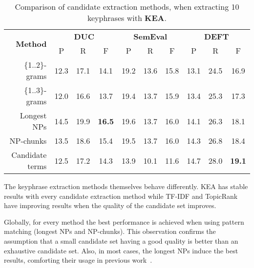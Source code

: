       \begin{table}
        \centering
        \begin{tabular}{rccccccccc}
          \toprule
          \multirow{2}{*}[-2pt]{\textbf{Method}} & \multicolumn{3}{c}{\textbf{DUC}} & \multicolumn{3}{c}{\textbf{SemEval}} & \multicolumn{3}{c}{\textbf{DEFT}}\\
          \cmidrule(r){2-4}\cmidrule(lr){5-7}\cmidrule(l){8-10}
          & P & R & F & P & R & F & P & R & F\\
          \midrule
          \{1..2\}-grams & 12.3 & 17.1 & 14.1 & 19.2 & 13.6 & 15.8 & 13.1 & 24.5 & 16.9\\
          \{1..3\}-grams & 12.0 & 16.6 & 13.7 & 19.4 & 13.7 & 15.9 & 13.4 & 25.3 & 17.3\\
          Longest NPs & 14.5 & 19.9 & \textbf{16.5} & 19.6 & 13.7 & 16.0 & 14.1 & 26.3 & 18.1\\
          NP-chunks & 13.5 & 18.6 & 15.4 & 19.5 & 13.7 & 16.0 & 14.3 & 26.8 & 18.4\\
          Candidate terms & 12.5 & 17.2 & 14.3 & 13.9 & 10.1 & 11.6 & 14.7 & 28.0 & \textbf{19.1}\\
          \bottomrule
        \end{tabular}
        \caption{Comparison of candidate extraction methods, when extracting 10
                 keyphrases with \textbf{KEA}.
                 \label{tab:kea_results}}
      \end{table}
      
      The keyphrase extraction methods themselves behave differently. KEA has
      stable results with every candidate extraction method while TF-IDF and
      TopicRank have improving results when the quality of the candidate set
      improves.

      Globally, for every method the best performance is achieved when using
      pattern matching (longest NPs and NP-chunks). This observation confirms
      the assumption that a small candidate set having a good quality is better
      than an exhaustive candidate set. Also, in most cases, the longest NPs
      induce the best results, comforting their usage in previous
      work~\cite{wan2008expandrank,hassan2010conundrums,bougouin2013topicrank}.

